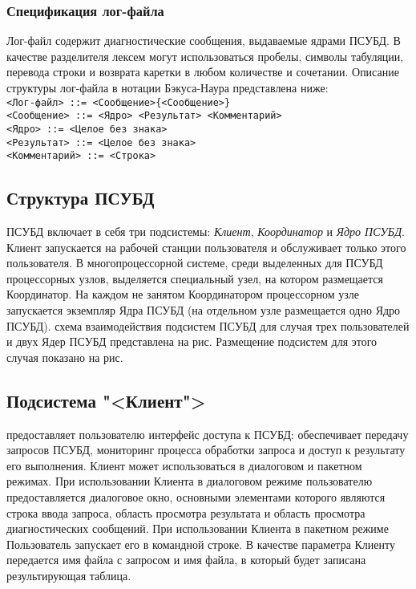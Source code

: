 \documentclass[11pt,oneside]{article}
\begin{document}
	\subsubsection{Спецификация лог-файла}\label{S_LOG}
	Лог-файл содержит диагностические сообщения, выдаваемые ядрами ПСУБД.
	В качестве разделителя лексем могут использоваться пробелы, символы табуляции, перевода строки и возврата каретки в любом количестве и сочетании. Описание структуры лог-файла в нотации Бэкуса-Наура представлена ниже:\\
	\texttt{<Лог-файл> ::= <Сообщение>\{<Сообщение>\}\\
		<Сообщение> ::= <Ядро> <Результат> <Комментарий>\\
		<Ядро> ::= <Целое без знака>\\
		<Результат> ::= <Целое без знака>\\
		<Комментарий> ::= <Строка>
	}
	
	\subsection{Структура ПСУБД}\label{S_PDBMSStructure}
	ПСУБД включает в себя три подсистемы: \textit{Клиент}, \textit{Координатор} и \textit{Ядро ПСУБД}. Клиент запускается на рабочей станции пользователя и обслуживает только этого пользователя. В многопроцессорной системе, среди выделенных для ПСУБД процессорных узлов, выделяется специальный узел, на котором размещается Координатор. На каждом не занятом Координатором процессорном узле запускается экземпляр Ядра ПСУБД (на отдельном узле размещается одно Ядро ПСУБД).
	 схема взаимодействия подсистем ПСУБД для случая трех пользователей и двух Ядер ПСУБД представлена на рис. %
	Размещение подсистем для этого случая показано на рис.%
	
	
	\subsection{Подсистема "<Клиент">}\label{S_Client}
	 предоставляет пользователю интерфейс доступа к ПСУБД: обеспечивает передачу запросов ПСУБД, мониторинг процесса обработки запроса и доступ к результату его выполнения. Клиент может использоваться в диалоговом и пакетном режимах. При использовании Клиента в диалоговом режиме пользователю предоставляется диалоговое окно, основными элементами которого являются строка ввода запроса, область просмотра результата и область просмотра диагностических сообщений. При использовании Клиента в пакетном режиме Пользователь запускает его в командной строке. В качестве параметра Клиенту передается имя файла с запросом и имя файла, в который будет записана результирующая таблица.
	
\end{document}
